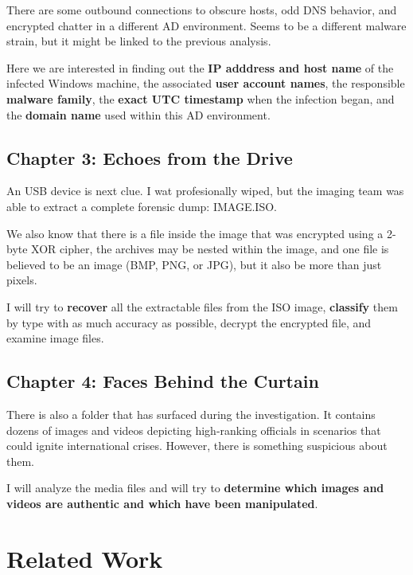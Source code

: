 \documentclass[pdflatex,sn-mathphys-num]{sn-jnl}
\begin{document}
\par There are some outbound connections to obscure hosts, odd DNS behavior, and encrypted chatter in a different AD
environment. Seems to be a different malware strain, but it might be linked to the previous analysis.

\par Here we are interested in finding out the \textbf{IP adddress and host name} of the infected Windows machine,
the associated \textbf{user account names}, the responsible \textbf{malware family}, the \textbf{exact UTC timestamp}
when the infection began, and the \textbf{domain name} used within this AD environment.

\subsection{Chapter 3: Echoes from the Drive}

\par An USB device is next clue. I wat profesionally wiped, but the imaging team was able to extract a complete forensic
dump: IMAGE.ISO\@.

\par We also know that there is a file inside the image that was encrypted using a 2-byte XOR cipher, the archives may
be nested within the image, and one file is believed to be an image (BMP, PNG, or JPG), but it also be more than just
pixels.

\par I will try to \textbf{recover} all the extractable files from the ISO image, \textbf{classify} them by type with
as much accuracy as possible, decrypt the encrypted file, and examine image files.

\subsection{Chapter 4: Faces Behind the Curtain}

\par There is also a folder that has surfaced during the investigation. It contains dozens of images and videos
depicting high-ranking officials in scenarios that could ignite international crises. However, there is something
suspicious about them.

\par I will analyze the media files and will try to \textbf{determine which images and videos are authentic and which
have been manipulated}.

\section{Related Work}\label{relatedwork}
\end{document}
